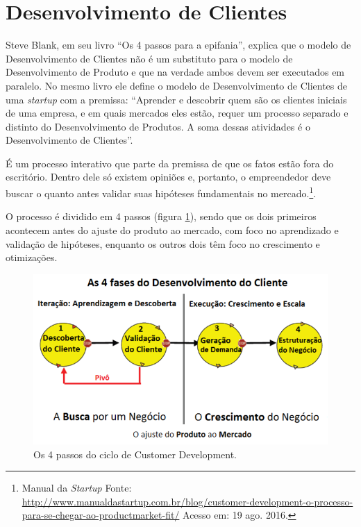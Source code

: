 \section{Desenvolvimento de Clientes}
\par Steve Blank, em seu livro ``Os 4 passos para a epifania'', explica que o modelo de Desenvolvimento de Clientes não é um substituto para o modelo de Desenvolvimento de Produto e que na verdade ambos devem ser executados em paralelo. No mesmo livro ele define o modelo de Desenvolvimento de Clientes de uma \emph{startup} com a premissa: “Aprender e descobrir quem são os clientes iniciais de uma empresa, e em quais mercados eles estão, requer um processo separado e distinto do Desenvolvimento de Produtos. A soma dessas atividades é o Desenvolvimento de Clientes”. \citep{blank:03}
\par É um processo interativo que parte da premissa de que os fatos estão fora do escritório. Dentro dele só existem opiniões e, portanto, o empreendedor deve buscar o quanto antes validar suas hipóteses fundamentais no mercado.\footnote{Manual da \emph{Startup} Fonte: \url{http://www.manualdastartup.com.br/blog/customer-development-o-processo-para-se-chegar-ao-productmarket-fit/} Acesso em: 19 ago. 2016.}.
\par O processo é dividido em 4 passos (figura \ref{fig:customerdevelopment}), sendo que os dois primeiros acontecem antes do ajuste do produto ao mercado, com foco no aprendizado e validação de hipóteses, enquanto os outros dois têm foco no crescimento e otimizações.
\begin{figure}[htb]
\centering
\includegraphics[width=15cm]{figuras/customerdevelopment}
\caption{\label{fig:customerdevelopment}Os 4 passos do ciclo de Customer Development.}
\end{figure}
